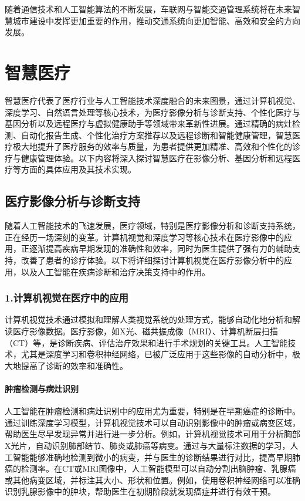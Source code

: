 随着通信技术和人工智能算法的不断发展，车联网与智能交通管理系统将在未来智慧城市建设中发挥更加重要的作用，推动交通系统向更加智能、高效和安全的方向发展。


\section{智慧医疗}

智慧医疗代表了医疗行业与人工智能技术深度融合的未来图景，通过计算机视觉、深度学习、自然语言处理等核心技术，为医疗影像分析与诊断支持、个性化医疗与基因分析以及远程医疗与虚拟健康助手等领域带来革新性进展。通过精确的病灶检测、自动化报告生成、个性化治疗方案推荐以及远程诊断和智能健康管理，智慧医疗极大地提升了医疗服务的效率与质量，为患者提供更加精准、高效和个性化的诊疗与健康管理体验。以下内容将深入探讨智慧医疗在影像分析、基因分析和远程医疗等方面的具体应用及其技术实现。

\subsection{医疗影像分析与诊断支持}

随着人工智能技术的飞速发展，医疗领域，特别是医疗影像分析和诊断支持系统，正在经历一场深刻的变革。计算机视觉和深度学习等核心技术在医疗影像中的应用，正逐渐提高疾病早期发现的准确性和效率，同时为医生提供了强有力的辅助支持，改善了患者的诊疗体验。以下将详细探讨计算机视觉在医疗影像分析中的应用，以及人工智能在疾病诊断和治疗决策支持中的作用。

\subsubsection{1.计算机视觉在医疗中的应用}

计算机视觉技术通过模拟和理解人类视觉系统的处理方式，能够自动化地分析和解读医疗影像数据。医疗影像，如X光、磁共振成像（MRI）、计算机断层扫描（CT）等，是诊断疾病、评估治疗效果和进行手术规划的关键工具。人工智能技术，尤其是深度学习和卷积神经网络，已被广泛应用于这些影像的自动分析中，极大地提高了诊断的效率和准确性。

\paragraph{肿瘤检测与病灶识别}

人工智能在肿瘤检测和病灶识别中的应用尤为重要，特别是在早期癌症的诊断中。通过训练深度学习模型，计算机视觉技术可以自动识别影像中的肿瘤或病变区域，帮助医生尽早发现异常并进行进一步分析。例如，计算机视觉技术可用于分析胸部X光片，自动识别肺部结节、肺炎或肺癌等病变。通过与大量标注数据的学习，人工智能能够准确地检测到微小的病变，并与医生的诊断结果进行对比，提高早期肺癌的检测率。在CT或MRI图像中，人工智能模型可以自动分割出脑肿瘤、乳腺癌或其他病变区域，并标注其大小、形状和位置。例如，使用卷积神经网络可以准确识别乳腺影像中的肿块，帮助医生在初期阶段就发现癌症并进行有效干预。

